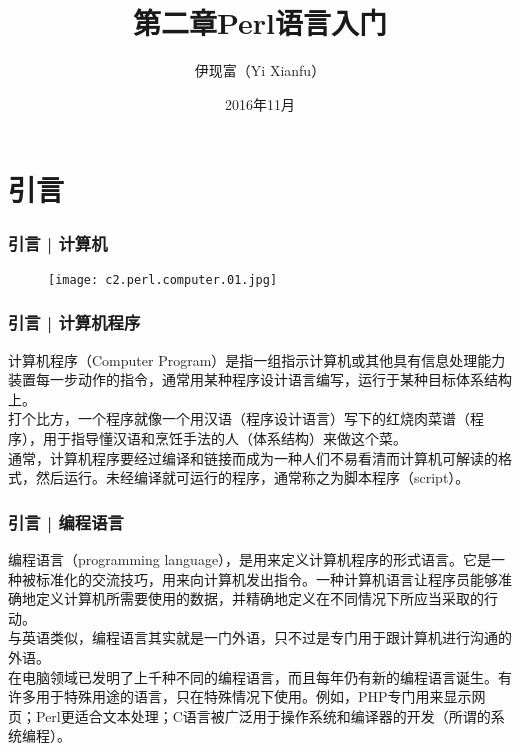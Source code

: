 



\title[Perl语言入门]{第二章\quad Perl语言入门}
\author[Yixf]{伊现富（Yi Xianfu）}
\date{2016年11月}



\section{引言}
\begin{frame}
  \frametitle{引言 | 计算机}
  \begin{figure}
    \centering
    \texttt{[image: c2.perl.computer.01.jpg]}
  \end{figure}
\end{frame}

\begin{frame}
  \frametitle{引言 | 计算机程序}
  计算机程序（Computer Program）是指一组指示计算机或其他具有信息处理能力装置每一步动作的指令，通常用某种程序设计语言编写，运行于某种目标体系结构上。\\
  \vspace{1em}
  打个比方，一个程序就像一个用汉语（程序设计语言）写下的红烧肉菜谱（程序），用于指导懂汉语和烹饪手法的人（体系结构）来做这个菜。\\
  \vspace{1em}
  通常，计算机程序要经过编译和链接而成为一种人们不易看清而计算机可解读的格式，然后运行。未经编译就可运行的程序，通常称之为脚本程序（script）。
\end{frame}

\begin{frame}
  \frametitle{引言 | 编程语言}
编程语言（programming language），是用来定义计算机程序的形式语言。它是一种被标准化的交流技巧，用来向计算机发出指令。一种计算机语言让程序员能够准确地定义计算机所需要使用的数据，并精确地定义在不同情况下所应当采取的行动。\\
  \vspace{1em}
与英语类似，编程语言其实就是一门外语，只不过是专门用于跟计算机进行沟通的外语。\\
  \vspace{1em}
在电脑领域已发明了上千种不同的编程语言，而且每年仍有新的编程语言诞生。有许多用于特殊用途的语言，只在特殊情况下使用。例如，PHP专门用来显示网页；Perl更适合文本处理；C语言被广泛用于操作系统和编译器的开发（所谓的系统编程）。
\end{frame}


